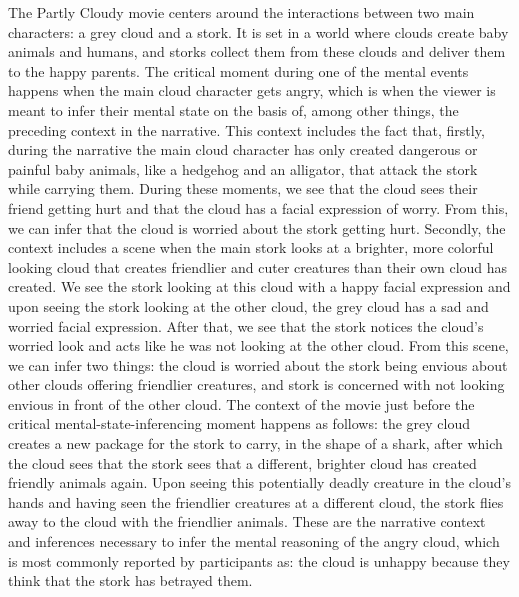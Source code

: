 The Partly Cloudy movie centers around the interactions between two main characters: a grey cloud and a stork. It is set in a world where clouds create baby animals and humans, and storks collect them from these clouds and deliver them to the happy parents. The critical moment during one of the mental events happens when the main cloud character gets angry, which is when the viewer is meant to infer their mental state on the basis of, among other things, the preceding context in the narrative. This context includes the fact that, firstly, during the narrative the main cloud character has only created dangerous or painful baby animals, like a hedgehog and an alligator, that attack the stork while carrying them. During these moments, we see that the cloud sees their friend getting hurt and that the cloud has a facial expression of worry. From this, we can infer that the cloud is worried about the stork getting hurt. Secondly, the context includes a scene when the main stork looks at a brighter, more colorful looking cloud that creates friendlier and cuter creatures than their own cloud has created. We see the stork looking at this cloud with a happy facial expression and upon seeing the stork looking at the other cloud, the grey cloud has a sad and worried facial expression. After that, we see that the stork notices the cloud's worried look and acts like he was not looking at the other cloud. From this scene, we can infer two things: the cloud is worried about the stork being envious about other clouds offering friendlier creatures, and stork is concerned with not looking envious in front of the other cloud. The context of the movie just before the critical mental-state-inferencing moment happens as follows: the grey cloud creates a new package for the stork to carry, in the shape of a shark, after which the cloud sees that the stork sees that a different, brighter cloud has created friendly animals again. Upon seeing this potentially deadly creature in the cloud's hands and having seen the friendlier creatures at a different cloud, the stork flies away to the cloud with the friendlier animals. These are the narrative context and inferences necessary to infer the mental reasoning of the angry cloud, which is most commonly reported by participants as: the cloud is unhappy because they think that the stork has betrayed them.  

